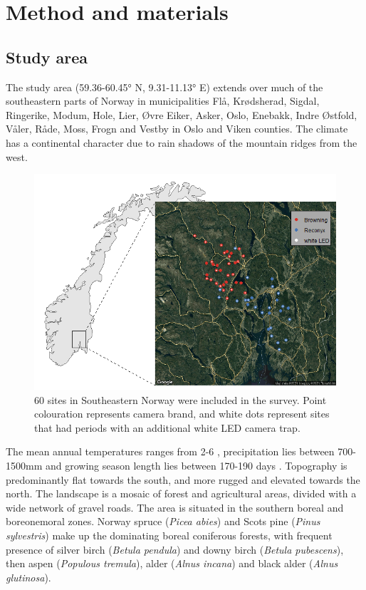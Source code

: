 \chapter{Method and materials}


\section{Study area} %


The study area (59.36-60.45° N, 9.31-11.13° E) extends over much of the southeastern parts of Norway in municipalities Flå, Krødsherad, Sigdal, Ringerike, Modum, Hole, Lier, Øvre Eiker, Asker, Oslo, Enebakk, Indre Østfold, Våler, Råde, Moss, Frogn and Vestby in Oslo and Viken counties. 
The climate has a continental character due to rain shadows of the mountain ridges from the west. 


\begin{figure}
\centering
\includegraphics[width=.8\textwidth]{../R/FLM_notebook_files/figure-gfm/study-map-1.png}
	\caption[Map of study area]
	{\small
	60 sites in Southeastern Norway were included in the survey. Point colouration represents camera brand, and white dots represent sites that had periods with an additional white LED camera trap.}
\label{fig:map}
\end{figure}

The mean annual temperatures ranges from 2-6 \celsius , precipitation lies between 700-1500mm and growing season length lies between 170-190 days \autocite{Moen1999}.
Topography is predominantly flat towards the south, and more rugged and elevated towards the north. The landscape is a mosaic of forest and agricultural areas, divided with a wide network of gravel roads.
The area is situated in the southern boreal and boreonemoral zones. %
Norway spruce (\textit{Picea abies}) and Scots pine (\textit{Pinus sylvestris}) make up the dominating boreal coniferous forests, with frequent presence of silver birch (\textit{Betula pendula}) and downy birch (\textit{Betula pubescens}), then aspen (\textit{Populous tremula}), alder (\textit{Alnus incana}) and black alder (\textit{Alnus glutinosa}).



